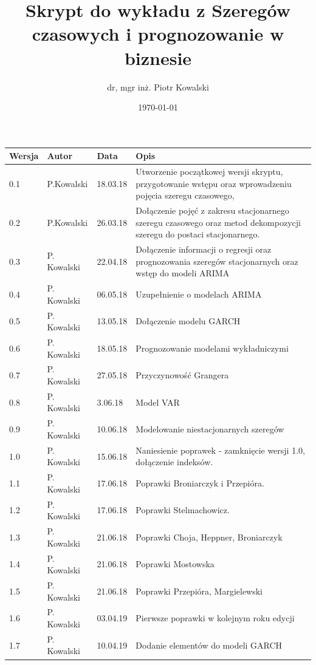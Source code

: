 \documentclass[10pt,a4paper]{book}
\author{dr, mgr inż. Piotr Kowalski}
\title{Skrypt do wykładu z Szeregów czasowych i prognozowanie w biznesie}
\date{\today}
\begin{document}
\begin{titlepage}
\maketitle
\end{titlepage}
\FloatBarrier

\begin{table}[h]
\centering
\begin{tabular}{|p{1cm}|p{2cm}|p{12mm}|p{12cm}|}\hline
Wersja & Autor & Data & Opis\\\hline
0.1 & P.Kowalski & 18.03.18& Utworzenie początkowej wersji skryptu, przygotowanie wstępu oraz wprowadzeniu pojęcia szeregu czasowego,\\\hline
0.2 & P.Kowalski & 26.03.18& Dołączenie pojęć z zakresu stacjonarnego szeregu czasowego oraz metod dekompozycji szeregu do postaci stacjonarnego.\\\hline
0.3 & P. Kowalski & 22.04.18 & Dołączenie informacji o regresji oraz prognozowania szeregów stacjonarnych oraz wstęp do modeli ARIMA \\\hline
0.4 & P. Kowalski & 06.05.18 & Uzupełnienie o modelach ARIMA \\\hline
0.5 & P. Kowalski & 13.05.18 & Dołączenie modelu GARCH \\\hline
0.6 & P. Kowalski & 18.05.18 & Prognozowanie modelami wykładniczymi \\\hline
0.7 & P. Kowalski & 27.05.18 & Przyczynowość Grangera \\\hline
0.8 & P. Kowalski & 3.06.18 & Model VAR \\\hline
0.9 & P. Kowalski & 10.06.18 & Modelowanie niestacjonarnych szeregów \\\hline
1.0 & P. Kowalski & 15.06.18 & Naniesienie poprawek - zamknięcie wersji 1.0, dołączenie indeksów. \\\hline
1.1 & P. Kowalski & 17.06.18 & Poprawki Broniarczyk i Przepióra. \\\hline
1.2 & P. Kowalski & 17.06.18 & Poprawki Stelmachowicz. \\\hline
1.3 & P. Kowalski & 21.06.18 & Poprawki Choja, Heppner, Broniarczyk  \\\hline
1.4 & P. Kowalski & 21.06.18 & Poprawki Mostowska  \\\hline
1.5 & P. Kowalski & 21.06.18 & Poprawki Przepióra, Margielewski  \\\hline
1.6 & P. Kowalski & 03.04.19 & Pierwsze poprawki w kolejnym roku edycji \\\hline
1.7 & P. Kowalski & 10.04.19 & Dodanie elementów do modeli GARCH \\\hline

\end{tabular}
\end{table}
\end{document}
